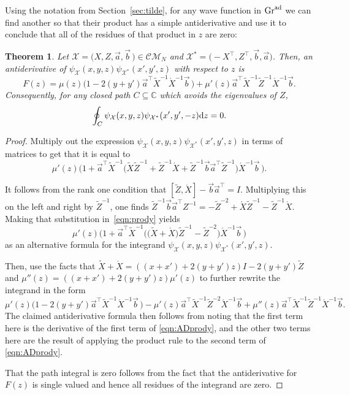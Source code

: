 \documentclass[pdftex]{sigma}
\numberwithin{equation}{section}
\newtheorem{Theorem}{Theorem}[section]
\theoremstyle{definition}
\def\X{\mathcal{X}}
\def\CM{\mathcal{C\!M}}
\begin{document}
Using the notation from Section~\ref{sec:tilde}, for any wave function
in ${\rm Gr}^{\rm ad}$ we can find another
so that their product has a simple antiderivative
and use it to conclude that all of the residues of that product in $z$
are zero:
\begin{Theorem}\label{thm:zint}
Let $\X=\bigl(X,Z,\vec a,\vec b\,\bigr)\in \CM_N$ and $\X^*=\bigl(-X^{\top},Z^{\top},\vec
b,\vec a\bigr)$.
Then, an antiderivative of $\psi_{\X}(x,y,z)\psi_{\X^*}(x',y',z)$
with respect to $z$ is
 \begin{equation}
F(z)=\mu(z)
\bigl(1-2(y+y')\vec a^{\top}\tilde X^{-1}\acute X^{-1}\vec
b\,\bigr)
+\mu'(z)
\vec a^{\top}\tilde X^{-1}\tilde Z^{-1}
\acute X^{-1}\vec b.
 \label{eqn:ADprody}
 \end{equation}
Consequently, for
any closed path $C\subseteq \mathbb{C}$ which avoids the eigenvalues
of $Z$,
\begin{equation}
 \oint_C \psi_{\X}(x,y,z)\psi_{\X^*}(x',y',-z){\rm d}z=0.
 \label{eqn:zintegralRES}
\end{equation}
 \end{Theorem}

\begin{proof}
Multiply out
the expression $\psi_{\X}(x,y,z)\psi_{\X^*}(x',y',z)$ in terms of matrices to get that it is equal to
\begin{equation}
\mu'(z)\bigl(1+\vec a^{\top}\tilde
 X^{-1}\bigl(\tilde X\tilde Z^{-1}+\tilde Z^{-1}\acute X
 +\tilde Z^{-1}\vec b\vec
 a^{\top}\tilde Z^{-1}\bigr)\acute X^{-1}\vec b\,\bigr).\label{eqn:prody}
\end{equation}

It follows from the rank one condition that $[\tilde Z,\acute X]-\vec
b\vec a^{\top}=I$. Multiplying this on the left and right by $\tilde
Z^{-1}$, one finds $\tilde Z^{-1}\vec b\vec a^{\top}Z^{-1}=-\tilde
Z^{-2}+\acute X\tilde Z^{-1}-\tilde Z^{-1}\acute X$. Making that
substitution in~\eqref{eqn:prody} yields
\[
 \mu'(z)\bigl(
 1+\vec a^{\top} \tilde X^{-1}\bigl(\bigl(\tilde X+\acute X\bigr)\tilde
 Z^{-1}-\tilde Z^{-2}\bigr)\acute X^{-1}\vec b\,\bigr)
\]
as an alternative formula for the integrand
$\psi_{\X}(x,y,z)\psi_{\X^*}(x',y',z)$.

Then, use the facts that $\tilde X+\acute
X=((x+x')+2(y+y')z)I-2(y+y')\tilde Z$ and
$\mu''(z)=((x+x')+2(y+y')z)\mu'(z)$ to further rewrite the integrand
in the form
\[
\mu'(z)\bigl(1-2(y+y')\vec a^{\top}\tilde X^{-1}\acute X^{-1}\vec b\,\bigr)
-
\mu'(z)\vec a^{\top}\tilde X^{-1}\tilde Z^{-2}\acute X^{-1}\vec b
+\mu''(z)\vec a^{\top}\tilde X^{-1}\tilde Z^{-1}\acute X^{-1}\vec b.
\]
The claimed antiderivative formula then follows from noting that the first term here is the derivative of the first term of \eqref{eqn:ADprody},
and the other two terms here are the result of applying the product
rule to the second term of \eqref{eqn:ADprody}.

That the path integral is zero follows from the fact that the antiderivative
for $F(z)$ is single valued and hence all residues of the integrand are zero.\end{proof}
\end{document}

